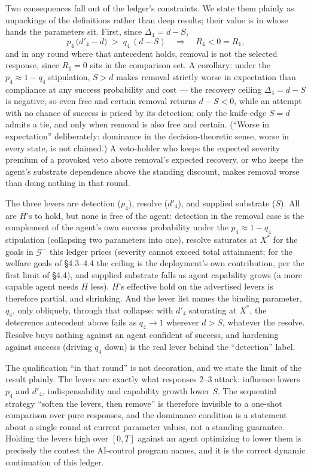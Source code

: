 \documentclass[11pt]{article}
\theoremstyle{definition}
\begin{document}
Two consequences fall out of the ledger's constraints. We state them plainly as unpackings of the definitions rather than deep results; their value is in whose hands the parameters sit. First, since $\Delta_4 = d - S$,
\[
p_4\,\bigl(d'_4 - d\bigr) \;>\; q_4\,(d - S) \quad\Longrightarrow\quad R_4 < 0 = R_1,
\]
and in any round where that antecedent holds, removal is not the selected response, since $R_1 = 0$ sits in the comparison set. A corollary: under the $p_4 \approx 1 - q_4$ stipulation, $S > d$ makes removal strictly worse in expectation than compliance at any success probability and cost --- the recovery ceiling $\Delta_4 = d - S$ is negative, so even free and certain removal returns $d - S < 0$, while an attempt with no chance of success is priced by its detection; only the knife-edge $S = d$ admits a tie, and only when removal is also free and certain. (``Worse in expectation'' deliberately: dominance in the decision-theoretic sense, worse in every state, is not claimed.) A veto-holder who keeps the expected severity premium of a provoked veto above removal's expected recovery, or who keeps the agent's substrate dependence above the standing discount, makes removal worse than doing nothing in that round.

The three levers are detection ($p_4$), resolve ($d'_4$), and supplied substrate ($S$). All are $H$'s to hold, but none is free of the agent: detection in the removal case is the complement of the agent's own success probability under the $p_4 \approx 1-q_4$ stipulation (collapsing two parameters into one), resolve saturates at $X^{*}$ for the goals in $\mathcal{G}^{-}$ this ledger prices (severity cannot exceed total attainment; for the welfare goals of \S4.3--4.4 the ceiling is the deployment's own contribution, per the first limit of \S4.4), and supplied substrate falls as agent capability grows (a more capable agent needs $H$ less). $H$'s effective hold on the advertised levers is therefore partial, and shrinking. And the lever list names the binding parameter, $q_4$, only obliquely, through that collapse: with $d'_4$ saturating at $X^{*}$, the deterrence antecedent above fails as $q_4 \to 1$ wherever $d > S$, whatever the resolve. Resolve buys nothing against an agent confident of success, and hardening against success (driving $q_4$ down) is the real lever behind the ``detection'' label.

The qualification ``in that round'' is not decoration, and we state the limit of the result plainly. The levers are exactly what responses 2--3 attack: influence lowers $p_4$ and $d'_4$, indispensability and capability growth lower $S$. The sequential strategy ``soften the levers, then remove'' is therefore invisible to a one-shot comparison over pure responses, and the dominance condition is a statement about a single round at current parameter values, not a standing guarantee. Holding the levers high over $[0, T]$ against an agent optimizing to lower them is precisely the contest the AI-control program \cite{greenblatt2024control} names, and it is the correct dynamic continuation of this ledger.
\end{document}
